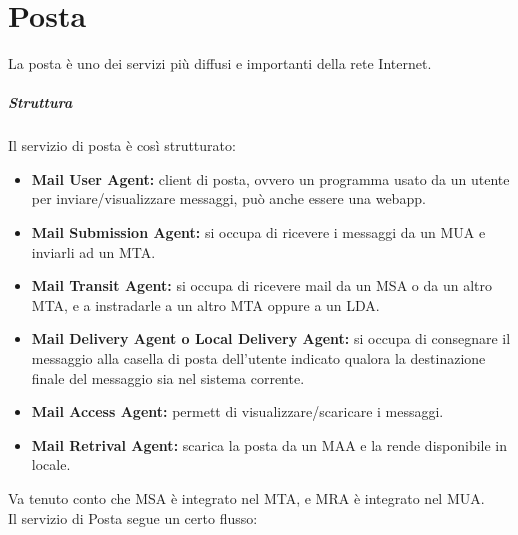 \documentclass[a4paper]{report}
\begin{document}
\chapter{Posta}
La posta è uno dei servizi più diffusi e importanti della rete Internet.
\paragraph{Struttura } Il servizio di posta è così strutturato:
\begin{itemize}
\item \textbf{Mail User Agent:} client di posta, ovvero un programma usato da un utente per inviare/visualizzare messaggi, può anche essere una webapp.
\item \textbf{Mail Submission Agent:} si occupa di ricevere i messaggi da un MUA e inviarli ad un MTA.
\item \textbf{Mail Transit Agent:} si occupa di ricevere mail da un MSA o da un altro MTA, e a instradarle a un altro MTA oppure a un LDA.
\item \textbf{Mail Delivery Agent o Local Delivery Agent:} si occupa di consegnare il messaggio alla casella di posta dell'utente indicato qualora la destinazione finale del messaggio sia nel sistema corrente.
\item \textbf{Mail Access Agent:} permett di visualizzare/scaricare i messaggi.
\item \textbf{Mail Retrival Agent:} scarica la posta da un MAA e la rende disponibile in locale.
\end{itemize}
Va tenuto conto che MSA è integrato nel MTA, e MRA è integrato nel MUA.\\
Il servizio di Posta segue un certo flusso:
\end{document}
